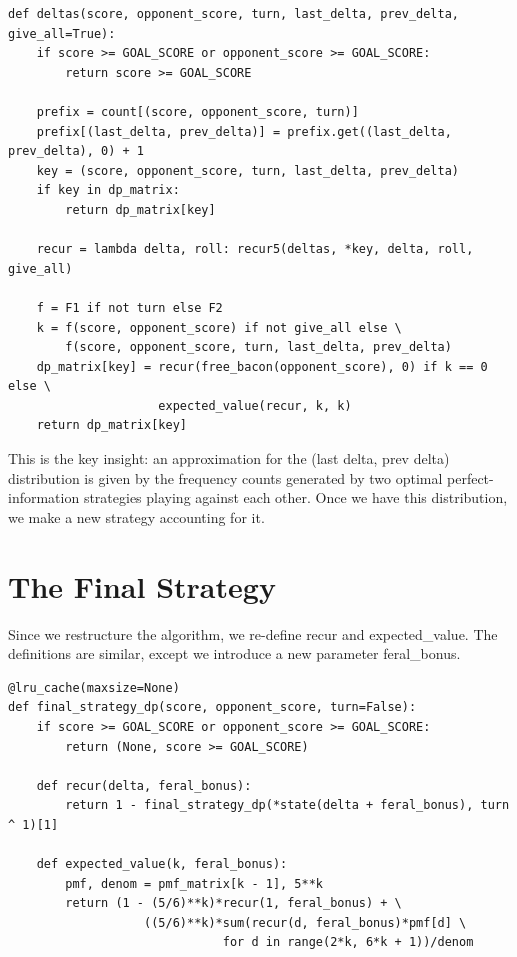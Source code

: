 \documentclass[11pt, oneside]{article}
\begin{document}
\begin{verbatim}
def deltas(score, opponent_score, turn, last_delta, prev_delta, give_all=True):
    if score >= GOAL_SCORE or opponent_score >= GOAL_SCORE:
        return score >= GOAL_SCORE

    prefix = count[(score, opponent_score, turn)]
    prefix[(last_delta, prev_delta)] = prefix.get((last_delta, prev_delta), 0) + 1
    key = (score, opponent_score, turn, last_delta, prev_delta)
    if key in dp_matrix:
        return dp_matrix[key]

    recur = lambda delta, roll: recur5(deltas, *key, delta, roll, give_all)

    f = F1 if not turn else F2
    k = f(score, opponent_score) if not give_all else \
        f(score, opponent_score, turn, last_delta, prev_delta)
    dp_matrix[key] = recur(free_bacon(opponent_score), 0) if k == 0 else \
                     expected_value(recur, k, k)
    return dp_matrix[key]
\end{verbatim} 

This is the key insight: an approximation for the (last delta, prev delta)
distribution is given by the frequency counts generated by 
two optimal perfect-information strategies playing against each other.
Once we have this distribution, we make a new strategy accounting for it.

\newpage

\section{The Final Strategy}

Since we restructure the algorithm, we re-define recur and expected\_value.
The definitions are similar, except we introduce a new parameter feral\_bonus.

\begin{verbatim}
@lru_cache(maxsize=None)
def final_strategy_dp(score, opponent_score, turn=False):
    if score >= GOAL_SCORE or opponent_score >= GOAL_SCORE:
        return (None, score >= GOAL_SCORE)

    def recur(delta, feral_bonus):
        return 1 - final_strategy_dp(*state(delta + feral_bonus), turn ^ 1)[1]

    def expected_value(k, feral_bonus):
        pmf, denom = pmf_matrix[k - 1], 5**k
        return (1 - (5/6)**k)*recur(1, feral_bonus) + \
                   ((5/6)**k)*sum(recur(d, feral_bonus)*pmf[d] \
                              for d in range(2*k, 6*k + 1))/denom  
\end{verbatim} 
\end{document}
